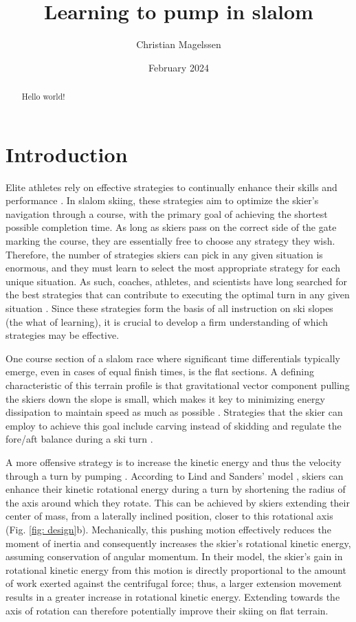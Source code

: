 \documentclass{article}
\title{Learning to pump in slalom}
\author{Christian Magelssen}
\date{February 2024}
\begin{document}
\begin{abstract}
    Hello world!
\end{abstract}


\section{Introduction}
Elite athletes rely on effective strategies to continually enhance their skills and performance \cite{krakauer_motor_2019, taylor_role_2012, gray_plateaus_2017, tsay_strategy_2023}. In slalom skiing, these strategies aim to optimize the skier's navigation through a course, with the primary goal of achieving the shortest possible completion time. As long as skiers pass on the correct side of the gate marking the course, they are essentially free to choose any strategy they wish. Therefore, the number of strategies skiers can pick in any given situation is enormous, and they must learn to select the most appropriate strategy for each unique situation\cite{tsay_strategy_2023}. As such, coaches, athletes, and scientists have long searched for the best strategies that can contribute to executing the optimal turn in any given situation \cite{lemaster_skiers_1999, lemaster_ultimate_2010, reid_kinematic_2010, joubert_how_1967, joubert_ski_1978, luginbuhl_identification_2023, lind_physics_2013}. Since these strategies form the basis of all instruction on ski slopes (the what of learning), it is crucial to develop a firm understanding of which strategies may be effective. 

One course section of a slalom race where significant time differentials typically emerge, even in cases of equal finish times, is the flat sections\cite{supej_new_2011}. A defining characteristic of this terrain profile is that gravitational vector component pulling the skiers down the slope is small\cite{howe_new_2001}, which makes it key to  minimizing energy dissipation to maintain speed as much as possible \cite{supej_differential_2008}. Strategies that the skier can employ to achieve this goal include carving instead of skidding and regulate the fore/aft balance during a ski turn \cite{reid_turn_2009, reid_kinematic_2010}. 

A more offensive strategy is to increase the kinetic energy and thus the velocity through a turn by pumping \cite{lind_physics_2013}. According to Lind and Sanders' model \cite{lind_physics_2013}, skiers can enhance their kinetic rotational energy during a turn by shortening the radius of the axis around which they rotate. This can be achieved by skiers extending their center of mass, from a laterally inclined position, closer to this rotational axis (Fig. \ref{fig: design}b). Mechanically, this pushing motion effectively reduces the moment of inertia and consequently increases the skier's rotational kinetic energy, assuming conservation of angular momentum. In their model, the skier's gain in rotational kinetic energy from this motion is directly proportional to the amount of work exerted against the centrifugal force; thus, a larger extension movement results in a greater increase in rotational kinetic energy. Extending towards the axis of rotation can therefore potentially improve their skiing on flat terrain. 
\end{document}
